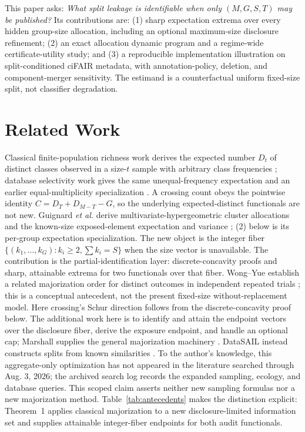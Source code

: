 \documentclass[conference,10pt]{IEEEtran}
\begin{document}
This paper asks: \emph{What split leakage is identifiable when only $(M,G,S,T)$ may be published?} Its contributions are: (1) sharp expectation extrema over every hidden group-size allocation, including an optional maximum-size disclosure refinement; (2) an exact allocation dynamic program and a regime-wide certificate-utility study; and (3) a reproducible implementation illustration on split-conditioned ciFAIR metadata, with annotation-policy, deletion, and component-merger sensitivity. The estimand is a counterfactual uniform fixed-size split, not classifier degradation.

\section{Related Work}
Classical finite-population richness work derives the expected number $D_t$ of distinct classes observed in a size-$t$ sample with arbitrary class frequencies \cite{hurlbert1971,walton1986}; database selectivity work gives the same unequal-frequency expectation and an earlier equal-multiplicity specialization \cite{christodoulakis1989,bitton1983}. A crossing count obeys the pointwise identity $C=D_T+D_{M-T}-G$, so the underlying expected-distinct functionals are not new. Guignard \emph{et al.} derive multivariate-hypergeometric cluster allocations and the known-size exposed-element expectation and variance \cite{guignard2024}; (2) below is its per-group expectation specialization. The new object is the integer fiber $\{(k_1,\ldots,k_G):k_i\geq2,\sum k_i=S\}$ when the size vector is unavailable. The contribution is the partial-identification layer: discrete-concavity proofs and sharp, attainable extrema for two functionals over that fiber. Wong--Yue establish a related majorization order for distinct outcomes in independent repeated trials \cite{wong1973}; this is a conceptual antecedent, not the present fixed-size without-replacement model. Here crossing's Schur direction follows from the discrete-concavity proof below. The additional work here is to identify and attain the endpoint vectors over the disclosure fiber, derive the exposure endpoint, and handle an optional cap; Marshall supplies the general majorization machinery \cite{marshall2011}. DataSAIL instead constructs splits from known similarities \cite{joeres2025}. To the author's knowledge, this aggregate-only optimization has not appeared in the literature searched through Aug. 3, 2026; the archived search log records the expanded sampling, ecology, and database queries. This scoped claim asserts neither new sampling formulas nor a new majorization method. Table~\ref{tab:antecedents} makes the distinction explicit: Theorem~1 applies classical majorization to a new disclosure-limited information set and supplies attainable integer-fiber endpoints for both audit functionals.
\end{document}
